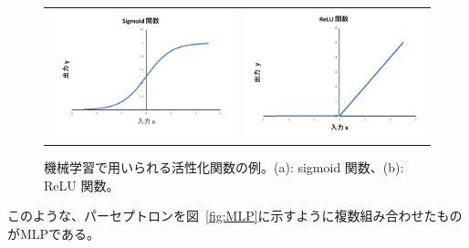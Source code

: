 \begin{figure}
    \begin{tabular}{cc}
    \begin{minipage}[b]{0.45\hsize}
        \vspace{1cm}
        \hspace*{-0.7cm}
        \includegraphics[clip, width=7cm]{fig/4/sigmoid.pdf}
        \subcaption{}
        \label{fig:sigmoid}
    \end{minipage}&
    \begin{minipage}[b]{0.55\hsize}
        \includegraphics[clip, width=7cm]{fig/4/ReLU.pdf}
        \subcaption{}
        \label{fig:ReLU}
    \end{minipage}
    \end{tabular}
    \caption{機械学習で用いられる活性化関数の例。(a): sigmoid 関数、(b): ReLU 関数。}
    \label{fig:acctivation}
\end{figure}
このような、パーセプトロンを図~\ref{fig:MLP}に示すように複数組み合わせたものがMLPである。
